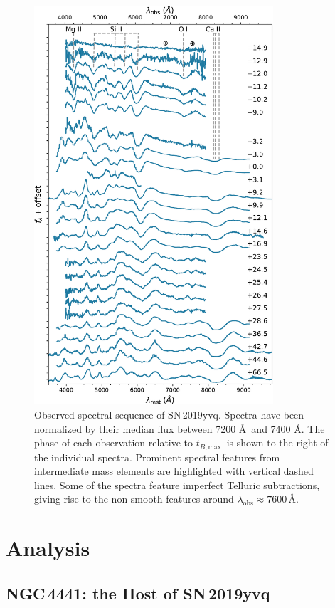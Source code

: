 \documentclass[twocolumn]{aastex63}
\newcommand{\tbmax}{$t_{B,\mathrm{max}}$}
\newcommand{\sn}{SN\,2019yvq}
\begin{document}
\begin{figure}
    \centering
    \includegraphics[width=3.5in]{./figures/spec_evo.pdf}
    \caption{Observed spectral sequence of \sn. Spectra have been normalized
    by their median flux between 7200 \AA\ and 7400 \AA. The phase of each
    observation relative to \tbmax\ is shown to the right of the individual
    spectra. Prominent spectral features from intermediate mass elements are
    highlighted with vertical dashed lines. Some of the spectra feature
    imperfect Telluric subtractions, giving rise to the non-smooth features
    around $\lambda_\mathrm{obs} \approx 7600$\,\AA.}
    \label{fig:spec_evo}
\end{figure}


\section{Analysis}\label{sec:analysis}

\subsection{NGC\,4441: the Host of \sn}\label{sec:host}
\end{document}
